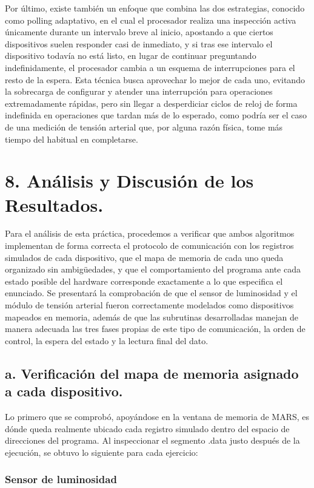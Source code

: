 \documentclass[12pt, letterpaper]{article}
\begin{document}
Por último, existe también un enfoque que combina las dos estrategias, conocido como polling adaptativo, en el cual el procesador realiza una inspección activa únicamente durante un intervalo breve al inicio, apostando a que ciertos dispositivos suelen responder casi de inmediato, y si tras ese intervalo el dispositivo todavía no está listo, en lugar de continuar preguntando indefinidamente, el procesador cambia a un esquema de interrupciones para el resto de la espera. Esta técnica busca aprovechar lo mejor de cada uno, evitando la sobrecarga de configurar y atender una interrupción para operaciones extremadamente rápidas, pero sin llegar a desperdiciar ciclos de reloj de forma indefinida en operaciones que tardan más de lo esperado, como podría ser el caso de una medición de tensión arterial que, por alguna razón física, tome más tiempo del habitual en completarse.\newpage

\section*{8. Análisis y Discusión de los Resultados.}

Para el análisis de esta práctica, procedemos a verificar que ambos algoritmos implementan de forma correcta el protocolo de comunicación con los registros simulados de cada dispositivo, que el mapa de memoria de cada uno queda organizado sin ambigüedades, y que el comportamiento del programa ante cada estado posible del hardware corresponde exactamente a lo que especifica el enunciado. Se presentará la comprobación de que el sensor de luminosidad y el módulo de tensión arterial fueron correctamente modelados como dispositivos mapeados en memoria, además de que las subrutinas desarrolladas manejan de manera adecuada las tres fases propias de este tipo de comunicación, la orden de control, la espera del estado y la lectura final del dato.

\subsection*{a. Verificación del mapa de memoria asignado a cada dispositivo.}

Lo primero que se comprobó, apoyándose en la ventana de memoria de MARS, es dónde queda realmente ubicado cada registro simulado dentro del espacio de direcciones del programa. Al inspeccionar el segmento .data justo después de la ejecución, se obtuvo lo siguiente para cada ejercicio:

\subsubsection*{\centering Sensor de luminosidad}
\end{document}

